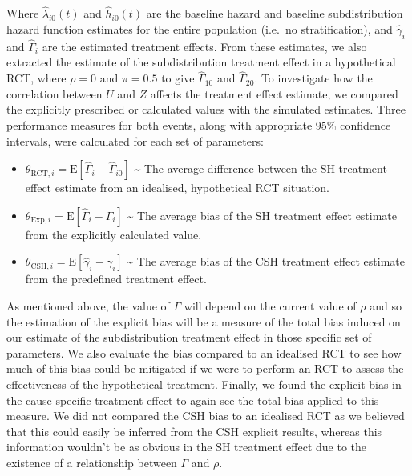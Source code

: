 \documentclass[12pt,PhD,twoside,openright]{muthesis}
\begin{document}
Where \(\hat{\lambda}_{i0}(t)\) and \(\hat{h}_{i0}(t)\) are the baseline hazard and baseline subdistribution hazard function estimates for the entire population (i.e.~no stratification), and \(\hat{\gamma}_i\) and \(\hat{\Gamma}_i\) are the estimated treatment effects. From these estimates, we also extracted the estimate of the subdistribution treatment effect in a hypothetical RCT, where \(\rho=0\) and \(\pi=0.5\) to give \(\hat{\Gamma}_{10}\) and \(\hat{\Gamma}_{20}\). To investigate how the correlation between \(U\) and \(Z\) affects the treatment effect estimate, we compared the explicitly prescribed or calculated values with the simulated estimates. Three performance measures for both events, along with appropriate 95\% confidence intervals, were calculated for each set of parameters:
\begin{itemize}
\item
  \(\theta_{\textrm{RCT},i} = \textrm{E}\left[\hat{\Gamma}_i - \hat{\Gamma}_{i0}\right]\) \textasciitilde{} The average difference between the SH treatment effect estimate from an idealised, hypothetical RCT situation.
\item
  \(\theta_{\textrm{Exp},i} = \textrm{E}\left[\hat{\Gamma}_i - \Gamma_i\right]\) \textasciitilde{} The average bias of the SH treatment effect estimate from the explicitly calculated value.
\item
  \(\theta_{\textrm{CSH},i} = \textrm{E}\left[\hat{\gamma}_i - \gamma_i\right]\) \textasciitilde{} The average bias of the CSH treatment effect estimate from the predefined treatment effect.
\end{itemize}
As mentioned above, the value of \(\Gamma\) will depend on the current value of \(\rho\) and so the estimation of the explicit bias will be a measure of the total bias induced on our estimate of the subdistribution treatment effect in those specific set of parameters. We also evaluate the bias compared to an idealised RCT to see how much of this bias could be mitigated if we were to perform an RCT to assess the effectiveness of the hypothetical treatment. Finally, we found the explicit bias in the cause specific treatment effect to again see the total bias applied to this measure. We did not compared the CSH bias to an idealised RCT as we believed that this could easily be inferred from the CSH explicit results, whereas this information wouldn't be as obvious in the SH treatment effect due to the existence of a relationship between \(\Gamma\) and \(\rho\).
\end{document}
